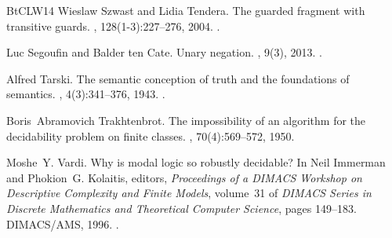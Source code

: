 \documentclass[10pt,a4paper]{amsart}
\theoremstyle{definition}
\numberwithin{equation}{section}
\theoremstyle{plain}
\theoremstyle{definition}
\theoremstyle{myexample}
\theoremstyle{plain}
\theoremstyle{definition}
\begin{document}
\begin{thebibliography}{BtCLW14}
Wieslaw Szwast and Lidia Tendera.
\newblock The guarded fragment with transitive guards.
, 128(1-3):227--276, 2004.
\newblock \href {https://doi.org/10.1016/j.apal.2004.01.003}
  {}.

Luc Segoufin and Balder ten Cate.
\newblock Unary negation.
, 9(3), 2013.
\newblock \href {https://doi.org/10.2168/LMCS-9(3:25)2013}
  {}.

Alfred Tarski.
\newblock The semantic conception of truth and the foundations of semantics.
, 4(3):341--376, 1943.
\newblock \href {https://doi.org/10.2307/2102968} {}.

Boris~Abramovich Trakhtenbrot.
\newblock The impossibility of an algorithm for the decidability problem on
  finite classes.
, 70(4):569--572, 1950.

Moshe~Y. Vardi.
\newblock Why is modal logic so robustly decidable?
\newblock In Neil Immerman and Phokion~G. Kolaitis, editors, {\em Proceedings
  of a {DIMACS} Workshop on Descriptive Complexity and Finite Models},
  volume~31 of {\em {DIMACS} Series in Discrete Mathematics and Theoretical
  Computer Science}, pages 149--183. {DIMACS/AMS}, 1996.
\newblock \href {https://doi.org/10.1090/DIMACS/031/05}
  {}.

\end{thebibliography}
\end{document}

